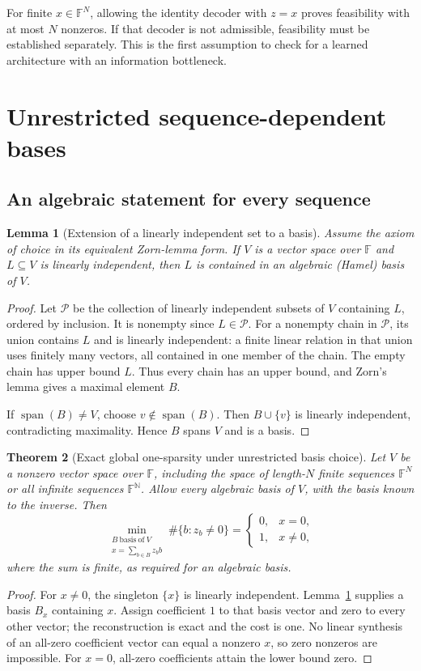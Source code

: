 \documentclass[11pt,a4paper]{article}
\newtheorem{theorem}{Theorem}
\newtheorem{lemma}[theorem]{Lemma}
\theoremstyle{definition}
\theoremstyle{remark}
\newcommand{\F}{\mathbb F}
\newcommand{\N}{\mathbb N}
\newcommand{\spanof}{\operatorname{span}}
\begin{document}
For finite $x\in\F^N$, allowing the identity decoder with $z=x$ proves feasibility
with at most $N$ nonzeros. If that decoder is not admissible, feasibility must
be established separately. This is the first assumption to check for a learned
architecture with an information bottleneck.

\section{Unrestricted sequence-dependent bases}

\subsection{An algebraic statement for every sequence}

\begin{lemma}[Extension of a linearly independent set to a basis]\label{lem:extension}
Assume the axiom of choice in its equivalent Zorn-lemma form. If $V$ is a vector
space over $\F$ and $L\subseteq V$ is linearly independent, then $L$ is contained
in an algebraic (Hamel) basis of $V$.
\end{lemma}
\begin{proof}
Let $\mathcal P$ be the collection of linearly independent subsets of $V$
containing $L$, ordered by inclusion. It is nonempty since $L\in\mathcal P$.
For a nonempty chain in $\mathcal P$, its union contains $L$ and is linearly
independent: a finite linear relation in that union uses finitely many vectors,
all contained in one member of the chain. The empty chain has upper bound $L$.
Thus every chain has an upper bound, and Zorn's lemma gives a maximal element $B$.

If $\spanof(B)\neq V$, choose $v\notin\spanof(B)$. Then $B\cup\{v\}$ is linearly
independent, contradicting maximality. Hence $B$ spans $V$ and is a basis.
\end{proof}

\begin{theorem}[Exact global one-sparsity under unrestricted basis choice]\label{thm:one}
Let $V$ be a nonzero vector space over $\F$, including the space of length-$N$
finite sequences $\F^N$ or all infinite sequences $\F^\N$. Allow every algebraic basis
of $V$, with the basis known to the inverse. Then
\[
\min_{\substack{B\ \mathrm{basis\ of}\ V\\x=\sum_{b\in B}z_b b}}
\#\{b:z_b\neq0\}
=
\begin{cases}
0,&x=0,\\
1,&x\neq0,
\end{cases}
\]
where the sum is finite, as required for an algebraic basis.
\end{theorem}
\begin{proof}
For $x\neq0$, the singleton $\{x\}$ is linearly independent.
Lemma~\ref{lem:extension} supplies a basis $B_x$ containing $x$. Assign coefficient
$1$ to that basis vector and zero to every other vector; the reconstruction is
exact and the cost is one. No linear synthesis of an all-zero coefficient vector
can equal a nonzero $x$, so zero nonzeros are impossible. For $x=0$, all-zero
coefficients attain the lower bound zero.
\end{proof}
\end{document}
